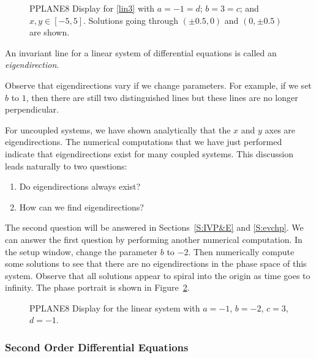 \documentclass{ximera}
\begin{document}
\begin{figure}[htb]
     \centerline{%
     }
     \caption{{\sf PPLANE8 Display} for \protect\eqref{lin3} with
             $a=-1=d$; $b=3=c$; and $x,y\in [-5,5]$.
	Solutions going through $(\pm 0.5,0)$ and $(0,\pm 0.5)$ are shown.}
     \label{F:invariantlines}
\end{figure}

\begin{definition} \label{D:eigendirection}
An invariant line for a linear system of differential equations
is called an {\em eigendirection}.
\end{definition}

Observe that eigendirections vary if we change parameters.  For
example, if we set $b$ to $1$, then there are still two
distinguished lines but these lines are no longer perpendicular.

For uncoupled systems, we have shown analytically that the $x$
and $y$ axes are eigendirections.  The numerical computations
that we have just performed indicate that eigendirections exist
for many coupled systems.  This discussion leads naturally to
two questions:
\begin{enumerate}
\item Do eigendirections always exist?
\item How can we find eigendirections?
\end{enumerate}
The second question will be answered in Sections~\ref{S:IVP&E} and 
\ref{S:evchp}.  We can answer the first question by performing another 
numerical computation.  In the setup window, change the parameter $b$ 
to $-2$.  Then numerically compute some solutions to see that there
are no eigendirections in the phase space of this system.  Observe that
all solutions appear to spiral into the origin as time goes to
infinity.  The phase portrait is shown in Figure~\ref{pp_dsp2}.
\begin{figure}[htb]
      \centerline{%
      }
      \caption{{\sf PPLANE8 Display} for the {\sf linear system}
		with $a=-1$, $b=-2$, $c=3$, $d=-1$.}
      \label{pp_dsp2}
\end{figure}

\subsubsection*{Second Order Differential Equations}
\end{document}
